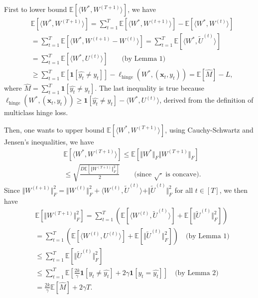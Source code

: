 \documentclass{article}
\begin{document}
First to lower bound $\mathbb{E}[\langle W^*,W^{(T+1)}\rangle]$, we have
\begin{equation}\label{eqn:5}
    \begin{aligned}
        &\mathbb{E}[\langle W^*,W^{(T+1)}\rangle]
        =\sum_{t=1}^T\mathbb{E}[\langle W^*,W^{(t+1)}\rangle]-\mathbb{E}[\langle W^*,W^{(t)}\rangle]\\
        &=\sum_{t=1}^T\mathbb{E}[\langle W^*,W^{(t+1)}-W^{(t)}\rangle]
        =\sum_{t=1}^T\mathbb{E}[\langle W^*,\tilde{U}^{(t)}\rangle]\\
        &=\sum_{t=1}^T\mathbb{E}[\langle W^*,U^{(t)}\rangle]\qquad\text{(by Lemma 1)}\\
        &\geq\sum_{t=1}^T\mathbb{E}[\mathbf{1}[\hat{y_t}\neq y_t]]-\ell_\text{hinge}(W^*,(\textbf{x}_t,y_t))
        =\mathbb{E}[\hat{M}]-L,
    \end{aligned}
\end{equation}
where $\hat{M}=\sum_{t=1}^T\mathbf{1}[\hat{y_t}\neq y_t]$. The last inequality is true because $\ell_{\text{hinge}}(W^*,(\mathbf{x}_t,y_t))\geq\mathbf{1}[\hat{y_t}\neq y_t]-\langle W^*,U^{(t)}\rangle$, derived from the definition of multiclass hinge loss.

Then, one wants to upper bound $\mathbb{E}[\langle W^*,W^{(T+1)}\rangle]$, using Cauchy-Schwartz and Jensen's inequalities, we have
\begin{equation}\label{eqn:6}
    \begin{aligned}
        &\mathbb{E}[\langle W^*,W^{(T+1)}\rangle]\leq\mathbb{E}[\Vert W^*\Vert_F\Vert W^{(T+1)}\Vert_F]\\
        &\leq\sqrt{\frac{D\mathbb{E}[\Vert W^{(T+1)}\Vert_F^2]}{2}}\qquad\text{(since }\sqrt{\cdotp}\text{ is concave)}.
    \end{aligned}
\end{equation}
Since $\Vert W^{(t+1)}\Vert_F^2=\Vert W^{(t )}\Vert_F^2+\langle W^{(t)},\tilde{U}^{(t)}\rangle+\Vert\tilde{U}^{(t)}\Vert^2_F$ for all $t\in [T]$, we then have
\begin{equation}\label{eqn:7}
    \begin{aligned}
        &\mathbb{E}[\Vert W^{(T+1)}\Vert_F^2]=\sum_{t=1}^T(\mathbb{E}[\langle W^{(t)},\tilde{U}^{(t)}\rangle]+\mathbb{E}[\Vert\tilde{U}^{(t)}\Vert^2_F])\\
        &=\sum_{t=1}^T(\mathbb{E}[\langle W^{(t)},{U}^{(t)}\rangle]+\mathbb{E}[\Vert\tilde{U}^{(t)}\Vert^2_F])\quad\text{(by Lemma 1)}\\
        &\leq\sum_{t=1}^T\mathbb{E}[\Vert\tilde{U}^{(t)}\Vert^2_F]\\
        &\leq\sum_{t=1}^T\mathbb{E}[\frac{2k}{\gamma}\mathbf{1}[y_t\neq \hat{y_t}]+2\gamma\mathbf{1}[y_t=\hat{y_t}]]\quad\text{(by Lemma 2)}\\
        &=\frac{2k}{\gamma}\mathbb{E}[\hat{M}] + 2\gamma T.
    \end{aligned}
\end{equation}
\end{document}
